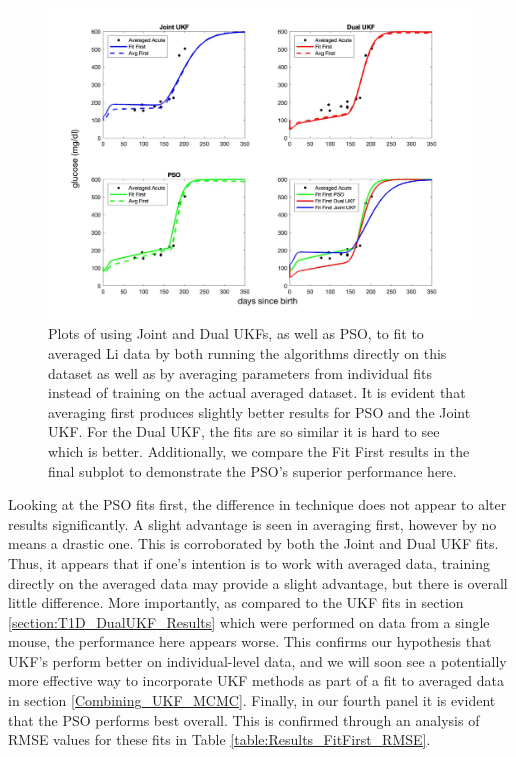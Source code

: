 \begin{figure}[H] 
    \centering
    \includegraphics[width=20cm]{Comparison_Figures/T1D_AveragingTechniques_PSOUKF_New.jpg}
    \caption{Plots of using Joint and Dual UKFs, as well as PSO, to fit to averaged Li data by both running the algorithms directly on this dataset as well as by averaging parameters from individual fits instead of training on the actual averaged dataset. It is evident that averaging first produces slightly better results for PSO and the Joint UKF. For the Dual UKF, the fits are so similar it is hard to see which is better. Additionally, we compare the Fit First results in the final subplot to demonstrate the PSO's superior performance here.}
    \label{fig:T1D_Results_AveragingTechniques_Comparison}
\end{figure}
Looking at the PSO fits first, the difference in technique does not appear to alter results significantly. A slight advantage is seen in averaging first, however by no means a drastic one. This is corroborated by both the Joint and Dual UKF fits. Thus, it appears that if one's intention is to work with averaged data, training directly on the averaged data may provide a slight advantage, but there is overall little difference. More importantly, as compared to the UKF fits in section \ref{section:T1D_DualUKF_Results} which were performed on data from a single mouse, the performance here appears worse. This confirms our hypothesis that UKF's perform better on individual-level data, and we will soon see a potentially more effective way to incorporate UKF methods as part of a fit to averaged data in section \ref{Combining_UKF_MCMC}. Finally, in our fourth panel it is evident that the PSO performs best overall. This is confirmed through an analysis of RMSE values for these fits in Table \ref{table:Results_FitFirst_RMSE}.


